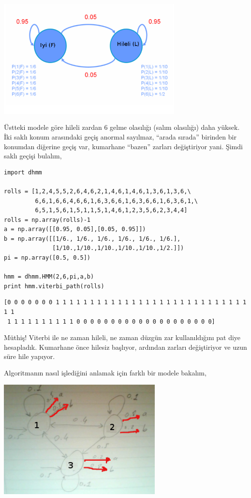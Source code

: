 \documentclass[12pt,fleqn]{article}\usepackage{../../common}
\begin{document}
\includegraphics[height=6cm]{tser_hmm_09.png}

Üstteki modele göre hileli zardan 6 gelme olasılığı (salım olasılığı) daha
yüksek. İki saklı konum arasındaki geçiş anormal sayılmaz, ``arada sırada''
birinden bir konumdan diğerine geçiş var, kumarhane ``bazen'' zarları
değiştiriyor yani. Şimdi saklı geçişi bulalım,

\begin{verbatim}
import dhmm

rolls = [1,2,4,5,5,2,6,4,6,2,1,4,6,1,4,6,1,3,6,1,3,6,\
         6,6,1,6,6,4,6,6,1,6,3,6,6,1,6,3,6,6,1,6,3,6,1,\
         6,5,1,5,6,1,5,1,1,5,1,4,6,1,2,3,5,6,2,3,4,4]
rolls = np.array(rolls)-1
a = np.array([[0.95, 0.05],[0.05, 0.95]])
b = np.array([[1/6., 1/6., 1/6., 1/6., 1/6., 1/6.], 
              [1/10.,1/10.,1/10.,1/10.,1/10.,1/2.]])
pi = np.array([0.5, 0.5])

hmm = dhmm.HMM(2,6,pi,a,b)
print hmm.viterbi_path(rolls)
\end{verbatim}

\begin{verbatim}
[0 0 0 0 0 0 0 1 1 1 1 1 1 1 1 1 1 1 1 1 1 1 1 1 1 1 1 1 1 1 1 1 1 1 1 1 1
 1 1 1 1 1 1 1 1 1 1 0 0 0 0 0 0 0 0 0 0 0 0 0 0 0 0 0 0 0 0]
\end{verbatim}

Müthiş! Viterbi ile ne zaman hileli, ne zaman düzgün zar kullanıldığını pat
diye hesapladık. Kumarhane önce hilesiz başlıyor, ardından zarları
değiştiriyor ve uzun süre hile yapıyor. 

Algoritmanın nasıl işlediğini anlamak için farklı bir modele bakalım,

\includegraphics[height=6cm]{tser_hmm_03.png}
\end{document}
